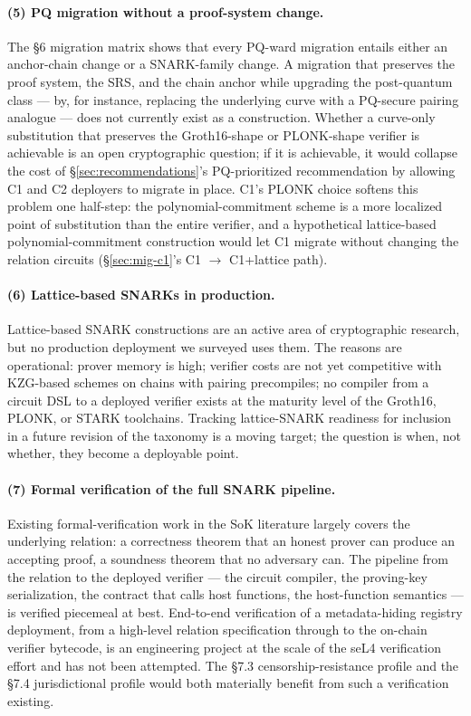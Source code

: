 \paragraph{(5) PQ migration without a proof-system change.} The §6
migration matrix shows that every PQ-ward migration entails either an
anchor-chain change or a SNARK-family change. A migration that
preserves the proof system, the SRS, and the chain anchor while
upgrading the post-quantum class --- by, for instance, replacing the
underlying curve with a PQ-secure pairing analogue --- does not
currently exist as a construction. Whether a curve-only substitution
that preserves the Groth16-shape or PLONK-shape verifier is
achievable is an open cryptographic question; if it is achievable,
it would collapse the cost of
\S\ref{sec:recommendations}'s PQ-prioritized recommendation by
allowing C1 and C2 deployers to migrate in place. C1's PLONK
choice softens this problem one half-step: the polynomial-commitment
scheme is a more localized point of substitution than the entire
verifier, and a hypothetical lattice-based polynomial-commitment
construction would let C1 migrate without changing the relation
circuits (\S\ref{sec:mig-c1}'s C1 $\to$ C1+lattice path).

\paragraph{(6) Lattice-based SNARKs in production.} Lattice-based
SNARK constructions are an active area of cryptographic research, but
no production deployment we surveyed uses them. The reasons are
operational: prover memory is high; verifier costs are not yet
competitive with KZG-based schemes on chains with pairing precompiles;
no compiler from a circuit DSL to a deployed verifier exists at the
maturity level of the Groth16, PLONK, or STARK toolchains. Tracking
lattice-SNARK readiness for inclusion in a future revision of the
taxonomy is a moving target; the question is when, not whether, they
become a deployable point.

\paragraph{(7) Formal verification of the full SNARK pipeline.}
Existing formal-verification work in the SoK literature largely
covers the underlying relation: a correctness theorem that an honest
prover can produce an accepting proof, a soundness theorem that no
adversary can. The pipeline from the relation to the deployed
verifier --- the circuit compiler, the proving-key serialization,
the contract that calls host functions, the host-function semantics
--- is verified piecemeal at best. End-to-end verification of a
metadata-hiding registry deployment, from a high-level relation
specification through to the on-chain verifier bytecode, is an
engineering project at the scale of the seL4 verification effort and
has not been attempted. The §7.3 censorship-resistance profile and
the §7.4 jurisdictional profile would both materially benefit from
such a verification existing.

